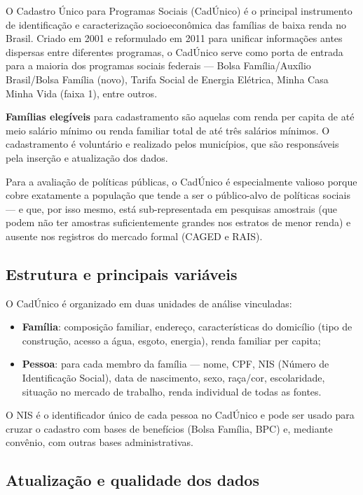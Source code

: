 O Cadastro Único para Programas Sociais (CadÚnico) é o principal instrumento de identificação e caracterização socioeconômica das famílias de baixa renda no Brasil. Criado em 2001 e reformulado em 2011 para unificar informações antes dispersas entre diferentes programas, o CadÚnico serve como porta de entrada para a maioria dos programas sociais federais — Bolsa Família/Auxílio Brasil/Bolsa Família (novo), Tarifa Social de Energia Elétrica, Minha Casa Minha Vida (faixa 1), entre outros.

\textbf{Famílias elegíveis} para cadastramento são aquelas com renda per capita de até meio salário mínimo ou renda familiar total de até três salários mínimos. O cadastramento é voluntário e realizado pelos municípios, que são responsáveis pela inserção e atualização dos dados.

Para a avaliação de políticas públicas, o CadÚnico é especialmente valioso porque cobre exatamente a população que tende a ser o público-alvo de políticas sociais — e que, por isso mesmo, está sub-representada em pesquisas amostrais (que podem não ter amostras suficientemente grandes nos estratos de menor renda) e ausente nos registros do mercado formal (CAGED e RAIS).

\subsection{Estrutura e principais variáveis}

O CadÚnico é organizado em duas unidades de análise vinculadas:

\begin{itemize}
  \item \textbf{Família}: composição familiar, endereço, características do domicílio (tipo de construção, acesso a água, esgoto, energia), renda familiar per capita;
  \item \textbf{Pessoa}: para cada membro da família — nome, CPF, NIS (Número de Identificação Social), data de nascimento, sexo, raça/cor, escolaridade, situação no mercado de trabalho, renda individual de todas as fontes.
\end{itemize}

O NIS é o identificador único de cada pessoa no CadÚnico e pode ser usado para cruzar o cadastro com bases de benefícios (Bolsa Família, BPC) e, mediante convênio, com outras bases administrativas.

\subsection{Atualização e qualidade dos dados}

